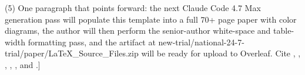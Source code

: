 (5) One paragraph that points forward: the next Claude Code 4.7 Max
generation pass will populate this template into a full 70+ page paper
with color diagrams, the author will then perform the senior-author
white-space and table-width formatting pass, and the artifact at
new-trial/national-24-7-trial/paper/LaTeX\_Source\_Files.zip will be
ready for upload to Overleaf. Cite \cite{fda2026realtime},
\cite{kawchak_2026_19176370}, \cite{kawchak_2026_19119939},
\cite{kawchak_2026_19396256}, \cite{Collins2024TRIPODAI}, and
\cite{ElEmam2024CREMLS}.]
